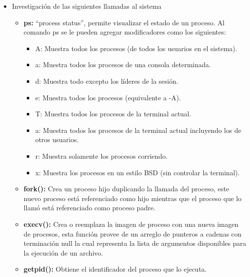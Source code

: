 \documentclass[12pt]{article}
\begin{document}
\begin{itemize}
\begin{itemize}
                                                        
        \end{itemize}
    \newpage     
        \item[\Checkmark] Investigación de las siguientes llamadas al sistema
        \begin{itemize}
        \item \textbf{ps:} “process status”, permite visualizar el estado de un proceso.
Al comando ps se le pueden agregar modificadores como los siguientes:
\begin{itemize}
\item A: Muestra todos los procesos (de todos los usuarios en el sistema).
\item a: Muestra todos los procesos de una consola determinada.
\item d: Muestra todo excepto los líderes de la sesión.
\item e: Muestra todos los procesos (equivalente a -A).
\item T: Muestra todos los procesos de la terminal actual.
\item a: Muestra todos los procesos de la terminal actual incluyendo los de otros usuarios.
\item r: Muestra solamente los procesos corriendo.
\item x: Muestra los procesos en un estilo BSD (sin controlar la terminal).
\end{itemize}


        \item \textbf{fork():} Crea un proceso hijo duplicando la llamada del proceso, este nuevo proceso está referenciado como hijo mientras que el proceso que lo llamó está referenciado como proceso padre.

        \item \textbf{execv():} Crea o reemplaza la imagen de proceso con una nueva imagen de procesos, esta función provee de un arreglo de punteros a cadenas con terminación null la cual representa la lista de argumentos disponibles para la ejecución de un archivo.

        \item \textbf{getpid():} Obtiene el identificador del proceso que lo ejecuta.


\end{itemize}
\end{itemize}
\end{document}
